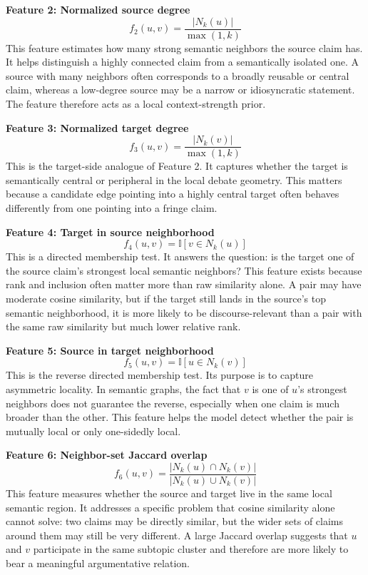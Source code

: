 \documentclass[11pt,a4paper]{article}
\begin{document}
\textbf{Feature 2: Normalized source degree}
\begin{equation}
f_2(u,v) = \frac{|N_k(u)|}{\max(1,k)}
\end{equation}
This feature estimates how many strong semantic neighbors the source claim has. It helps distinguish a highly connected
claim from a semantically isolated one. A source with many neighbors often corresponds to a broadly reusable or central
claim, whereas a low-degree source may be a narrow or idiosyncratic statement. The feature therefore acts as a local
context-strength prior.

\textbf{Feature 3: Normalized target degree}
\begin{equation}
f_3(u,v) = \frac{|N_k(v)|}{\max(1,k)}
\end{equation}
This is the target-side analogue of Feature 2. It captures whether the target is semantically central or peripheral in
the local debate geometry. This matters because a candidate edge pointing into a highly central target often behaves
differently from one pointing into a fringe claim.

\textbf{Feature 4: Target in source neighborhood}
\begin{equation}
f_4(u,v) = \mathbb{I}[v \in N_k(u)]
\end{equation}
This is a directed membership test. It answers the question: is the target one of the source claim's strongest local
semantic neighbors? This feature exists because rank and inclusion often matter more than raw similarity alone. A pair
may have moderate cosine similarity, but if the target still lands in the source's top semantic neighborhood, it is
more likely to be discourse-relevant than a pair with the same raw similarity but much lower relative rank.

\textbf{Feature 5: Source in target neighborhood}
\begin{equation}
f_5(u,v) = \mathbb{I}[u \in N_k(v)]
\end{equation}
This is the reverse directed membership test. Its purpose is to capture asymmetric locality. In semantic graphs, the
fact that \(v\) is one of \(u\)'s strongest neighbors does not guarantee the reverse, especially when one claim is much
broader than the other. This feature helps the model detect whether the pair is mutually local or only one-sidedly
local.

\textbf{Feature 6: Neighbor-set Jaccard overlap}
\begin{equation}
f_6(u,v) = \frac{|N_k(u) \cap N_k(v)|}{|N_k(u) \cup N_k(v)|}
\end{equation}
This feature measures whether the source and target live in the same local semantic region. It addresses a specific
problem that cosine similarity alone cannot solve: two claims may be directly similar, but the wider sets of claims
around them may still be very different. A large Jaccard overlap suggests that \(u\) and \(v\) participate in the same
subtopic cluster and therefore are more likely to bear a meaningful argumentative relation.
\end{document}
